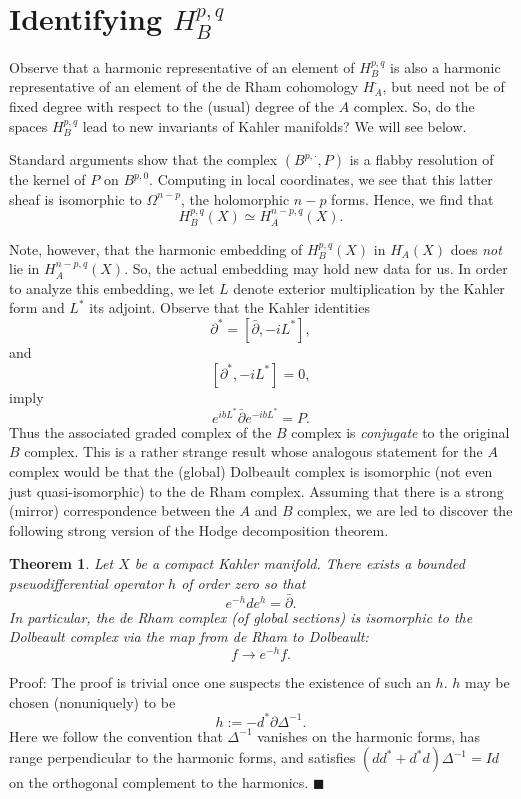 \documentclass[a4paper,11pt]{amsart}
\newcommand{\db}{\bar{\partial}}
\newcommand{\p}{\partial}
\newtheorem{theorem}{Theorem}[section]
\begin{document}
\section{Identifying $H_B^{p,q}$}
Observe that a harmonic representative of an element of $H^{p,q}_B$ is also a 
harmonic representative of an element of the de Rham cohomology $H^{\cdot}_A$, 
but need not be of fixed degree with respect to the (usual) degree of the 
$A$ complex. So, do the spaces $H^{p,q}_B$ lead to new invariants of Kahler 
manifolds? We will see below.

Standard arguments show that the complex $(B^{p,\cdot},P)$ is a flabby 
resolution of the kernel of $P$ on $B^{p,0}$. Computing in local coordinates,
we see that this latter sheaf is isomorphic to $\Omega^{n-p}$, the holomorphic
 $n-p$ forms. Hence, we find that 
\begin{equation}\label{mirror1}
H^{p,q}_B(X) \simeq H^{n-p,q}_A(X).
\end{equation}

Note, however, that the harmonic embedding of $H^{p,q}_B(X)$ in 
$H_A^{\cdot}(X)$ does {\em not} lie in $H^{n-p,q}_A(X)$. So, the actual
 embedding may hold new data for us.
   In order to analyze this embedding, we let $L$ denote exterior multiplication 
 by the Kahler form and $L^*$ its adjoint. Observe that the Kahler identities
   $$\partial^* = [\db,-iL^*],$$
   and
    $$[\partial^*,-iL^*] = 0,$$
 imply 
$$e^{ibL^*}\db e^{-ibL^*} = P.$$
Thus the associated graded complex of the $B$ complex is {\em conjugate} to the 
original $B$ complex. This is a rather strange result whose analogous 
statement for the $A$ complex would be that the (global) Dolbeault complex is isomorphic 
(not even just quasi-isomorphic) to the de Rham complex. Assuming that there is a
 strong (mirror) correspondence between the $A$ and $B$ complex, we are led to
  discover the following strong version of the Hodge decomposition theorem. 
\begin{theorem}
Let $X$ be a compact Kahler manifold. 
There exists a bounded pseuodifferential operator $h$ of order zero 
so that 
$$e^{-h}de^{h} = \db.$$
In particular, the de Rham complex (of global sections) is isomorphic to the Dolbeault complex 
via the map from de Rham to Dolbeault:
$$f\rightarrow e^{-h}f.$$
\end{theorem}
\noindent
Proof: The proof is trivial once one suspects the existence of such an $h$. 
$h$ may be chosen (nonuniquely) to be  
$$h := -d^*\p\Delta^{-1}.$$
Here we follow the convention that $\Delta^{-1}$ vanishes on the harmonic 
forms, has range perpendicular to the harmonic forms, and satisfies 
$(dd^*+d^*d)\Delta^{-1} = Id$ on the orthogonal complement to the 
harmonics. $\blacksquare$
\end{document}
